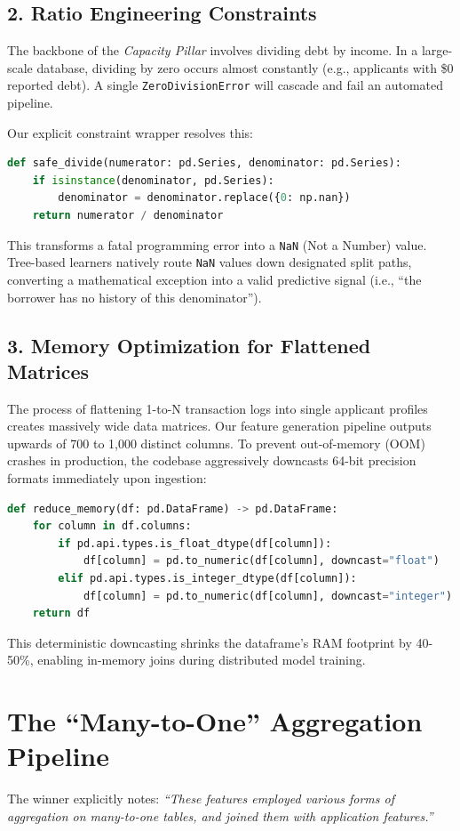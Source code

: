 \documentclass[11pt,a4paper]{article}
\begin{document}
\subsection{2. Ratio Engineering Constraints}
The backbone of the \textit{Capacity Pillar} involves dividing debt by income. In a large-scale database, dividing by zero occurs almost constantly (e.g., applicants with \$0 reported debt). A single \texttt{ZeroDivisionError} will cascade and fail an automated pipeline. 

Our explicit constraint wrapper resolves this:
\begin{lstlisting}[language=Python]
def safe_divide(numerator: pd.Series, denominator: pd.Series):
    if isinstance(denominator, pd.Series):
        denominator = denominator.replace({0: np.nan})
    return numerator / denominator
\end{lstlisting}

This transforms a fatal programming error into a \texttt{NaN} (Not a Number) value. Tree-based learners natively route \texttt{NaN} values down designated split paths, converting a mathematical exception into a valid predictive signal (i.e., ``the borrower has no history of this denominator'').

\subsection{3. Memory Optimization for Flattened Matrices}
The process of flattening 1-to-N transaction logs into single applicant profiles creates massively wide data matrices. Our feature generation pipeline outputs upwards of 700 to 1,000 distinct columns. To prevent out-of-memory (OOM) crashes in production, the codebase aggressively downcasts 64-bit precision formats immediately upon ingestion:

\begin{lstlisting}[language=Python]
def reduce_memory(df: pd.DataFrame) -> pd.DataFrame:
    for column in df.columns:
        if pd.api.types.is_float_dtype(df[column]):
            df[column] = pd.to_numeric(df[column], downcast="float")
        elif pd.api.types.is_integer_dtype(df[column]):
            df[column] = pd.to_numeric(df[column], downcast="integer")
    return df
\end{lstlisting}
This deterministic downcasting shrinks the dataframe's RAM footprint by 40-50\%, enabling in-memory joins during distributed model training.

\section{The ``Many-to-One'' Aggregation Pipeline}
The winner explicitly notes: \textit{``These features employed various forms of aggregation on many-to-one tables, and joined them with application features.''} 
\end{document}
